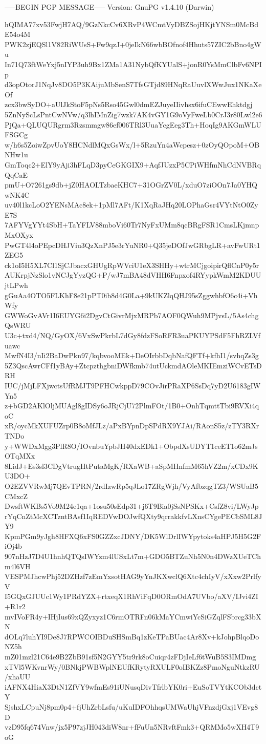 -----BEGIN PGP MESSAGE-----
Version: GnuPG v1.4.10 (Darwin)

hQIMA77xv53FwjH7AQ/9GzNkcCv6XRvP4WCmtVyDBZSojHKjtYNSm0McBdE54o4M
PWK2zjEQSl1V82RiWUsS+Fw9qzJ+0jeIkN66wbBOfnof4Hhuts57ZIC2bBno4gWu
In71Q73ftWeYxj5nIYP3uh9Bx1ZMa1A31NybQfKYUalS+jonR0YsMmClbFv6NPIp
d3opOtorJ1NqJv8DO5P3KAijuMbSenS7TfsGTjd89HNqRaUuvlXWwJux1NKaXeOf
zcx3bwSyDO+aUlJkStoF5pNs5Rso45Gwl0dmEZJuyeIIivhsx6ifuCEwwEhktdgj
5ZnNyScLsPntCwNVw/q3lhIMnZig7wzk7AK4vGY1G9oVyFweLb0CrJ3r80Lwl2e6
PjQa+QLUQURgrm3Rzsmmgw86ef006TRl3UuaYcgEeg3Th+HoqIg9AKGmWLUFSGCg
w/h6s5ZoiwZpvUoY8HCNdlMQxGsWx/l+5RzuYn4aWcpesz+0zOyQOpoM+OBNHw1u
GmToqc2+ElY9yAji3hFLqD3pyCeGKGIX9+AqfJUzxP5CPiWHfmNhCdNVBRqQqCaE
pmU+O7261gs9db+jZ0HAOLTzbaeKHC7+31OGrZV0L/xduO7ziOOn7Ja0YHQwNK4C
uv40l1kcLoO2YENsMAc8ek+1pMl7AFt/K1XqRaJHq20LOPhaGsr4VYtNtO0ZyE7S
7AFYVgYYt4SbH+TaYFLV88mboVi60Tr7NyFxUMm8qcBRgFSR1CmsLKjmnpMxOXyx
PwGT4l4oPEpcDHJViu3QzXnPJ5e3rYuNR0+Q35jeDOfJwGRbgLR+avFwURt1ZEG5
ck1oI5H5XL7Cl1SjCJbacxGHUgRpWVciU1eX3SHHy+wtrMCjgoipirQflCnP0y5r
AUKrpjNzSlo1vNCJgYyzQG+P/wJ7mBA48dVHH6Fnpxof4RYypkWmM2KDUUjtLPwh
gGuAa4OTO5FLKhF8e21pPT0ib8d4G0La+9kUKZlqQHJ95sZggwhbfO6c4i+VhWfy
GWWoGvAVr1I6EUYG6i2DgvCtGivrMjxMRPb7AOF0QWuh9MPjvsL/5As4chgQsWRU
U3c+txd4/NQ/GyOX/6VxSwPkrbL7dGy8fdzFSoRFR3uaPKUYPSdF5FhRZLVfuawc
MwfN4I3/nIi2BaDwPkn97/kqbvooMEk+DeOIrbbDqbNafQFTf+kfhI1/svhqZs3g
5Z3QscAwrCFf1yBAy+ZtcpzthgbniDWfkmb74utUckmdAOleMKIEmziWCvETsDRH
IUC/jMjLFXjwctsUfRMJT9PFHCwkppD79COvJirPRaXP6SsDq7yD2U6183gIWYn5
z+bGD2AKlOljMUAgl8gIDSy6oJRjCjU72PlmFOt/1B0+OnhTqmttTbi9RVXi4qoC
xR/oycMkXUFUZrp0B8oMfJLz/aPxBYpnDpSPdRX9YJAi/RAonS5z/zTY3RXrTNDo
y+WWDxMgg3PlR8O/IOvnbuYpbJH40dxEDk1+ObpdXsUDYT1ceET1o62mJsOTqMXx
8LidJ+Es3sl3CDgVtrugHtPutaMgK/RXaWB+aSpMHnfmM65hVZ2m/xCDx9KU3DO+
O2EZVVRwMj7QEvTPRN/2rdIzwRp5qJLo17ZRgWjh/VyAfbzqgTZ3/WSUaB5CMxcZ
DwsftWKBs5Vo9M24e1qa+1osu50sEdp31+j6T9Bia0jSsNPSKx+CsfZ8vi/LWyJp
rYqCnZtMcXCTzntBAsf1IqREDVwDOJwfQXty9qrrakkfvLXnsCYgePECbSML8JY9
KpmPGm9yJgh8HFXQ6xFS0GZZxcJDNY/DK5WlDrlIWYpytoks4aHPJ5H5G2FiOj4b
907nHzJ7D4U1hnhQTQsIWYzm4lUSxLt7m+GDO5BTZuNh5N0n4DWzXUeTChm4l6VH
VESPMJhcwPhj52DZHzf7zEmYxsotHAG9yYnJKXwclQ6Xtc4chIyV/xXxw2PrlfyV
I5GQxGJUUc1Wy1PRdYZX+rtxeqX1RhViFqD0ORmOdA7UVbo/aXV/IJvi4ZI+R1r2
mvIVoFR4y+IHjIus69xQZyxyz1C6rmOTRFn06kMaYCmwiYcSiGZqlFSbrcg33bXN
dOLq7luhYI9De8J7RPWCOIBDuSHSmBq1zKeTPaBUac4Ar8Xv+kJohpBlqoDoNZ5h
mZ01mzl21C64e9B2ZbB91sf5N2GYY5tr9rk8oCuiqr4zFDjIeLf6tWuB5S3IMDmg
xTVl5WKvnrWy/0BNkjPWBWplNEUfKRytyRXULF0oIBKZz8PmoNguNtkzRU/xhaUU
iAFNX4HiaX3DtN1ZfVY9wfmEs91iUNusqDivTfrlbYK0ri+EuSoTVYtKCOb3dctY
SjshxLCpuNj8pm0p4+fjUhZrbLsfu/uKuIDFOhhqsUMWaUhjVFnzdjGxj1VEvg8D
vzD95fq674Vnw/jx5P97zjJH043diW8nr+fFuUn5NRvftFmk3+QRMMo5wXH4T9oG
